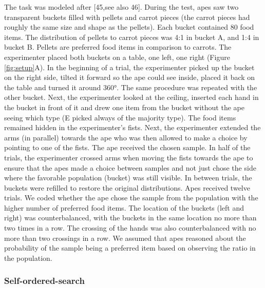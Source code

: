 \documentclass[
  man,floatsintext]{apa6}
\begin{document}
The task was modeled after {[}45,see also 46{]}. During the test, apes saw two transparent buckets filled with pellets and carrot pieces (the carrot pieces had roughly the same size and shape as the pellets). Each bucket contained 80 food items. The distribution of pellets to carrot pieces was 4:1 in bucket A, and 1:4 in bucket B. Pellets are preferred food items in comparison to carrots. The experimenter placed both buckets on a table, one left, one right (Figure \ref{fig:setup}A). In the beginning of a trial, the experimenter picked up the bucket on the right side, tilted it forward so the ape could see inside, placed it back on the table and turned it around 360°. The same procedure was repeated with the other bucket. Next, the experimenter looked at the ceiling, inserted each hand in the bucket in front of it and drew one item from the bucket without the ape seeing which type (E picked always of the majority type). The food items remained hidden in the experimenter's fists. Next, the experimenter extended the arms (in parallel) towards the ape who was then allowed to make a choice by pointing to one of the fists. The ape received the chosen sample. In half of the trials, the experimenter crossed arms when moving the fists towards the ape to ensure that the apes made a choice between samples and not just chose the side where the favorable population (bucket) was still visible. In between trials, the buckets were refilled to restore the original distributions. Apes received twelve trials. We coded whether the ape chose the sample from the population with the higher number of preferred food items. The location of the buckets (left and right) was counterbalanced, with the buckets in the same location no more than two times in a row. The crossing of the hands was also counterbalanced with no more than two crossings in a row. We assumed that apes reasoned about the probability of the sample being a preferred item based on observing the ratio in the population.

\subsubsection{Self-ordered-search}\label{self-ordered-search}
\end{document}
